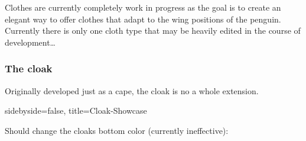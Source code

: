 \documentclass[parskip=half,english,numbers=noenddot,footnotes=nomultiple,oneside]{scrartcl}
\begin{document}
Clothes are currently completely work in progress as the goal is to create an elegant way to offer clothes that adapt to the wing positions of the penguin.
Currently there is only one cloth type that may be heavily edited in the course of development\ldots

\subsubsection{The cloak}

Originally developed just as a cape, the cloak is no a whole extension.

\begin{tcblisting}{}
\begin{tikzpicture}
	\pingu[cloak=green]
\end{tikzpicture}
\end{tcblisting}
\endkeyexplain

\begin{tcblisting}{sidebyside=false, title=Cloak-Showcase}
\end{tcblisting}

{\def\pingu@color@cloak{<cloak-color>}
\begin{tcblisting}{}
\begin{tikzpicture}
	\pingu[cloak, cloak cap=green]
\end{tikzpicture}
\end{tcblisting}
\endsubkeyexplain}

{\def\pingu@color@cloak{<cloak-color>}
\begin{tcblisting}{}
\begin{tikzpicture}
	\pingu[cloak, cloak wings color=green]
\end{tikzpicture}
\end{tcblisting}
\endsubkeyexplain}

{\def\pingu@color@cloak{<cloak-color>}
	Should change the cloaks bottom color (currently ineffective):
\begin{tcblisting}{}
\begin{tikzpicture}
	\pingu[cloak, cloak bottom color=green]
\end{tikzpicture}
\end{tcblisting}
\endsubkeyexplain}
\end{document}
